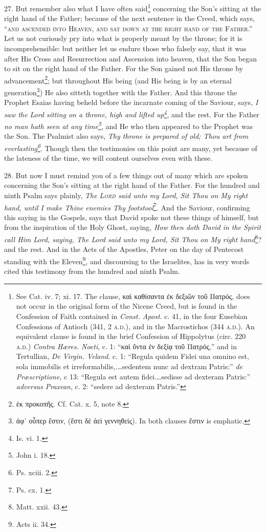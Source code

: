 27. But remember also what I have often said\footnote{See Cat. iv. 7; xi. 17. The clause, \textgreek{καὶ καθίσαντα ἐκ δεξιῶν τοῦ Πατρός}, does not occur in the original form of the Nicene Creed, but is found in the Confession of Faith contained in \emph{Const. Apost}. c. 41, in the four Eusebian Confessions of Antioch (341, 2 \textsc{a.d.}), and in the Macrostichos (344 \textsc{a.d.}). An equivalent clause is found in the brief Confession of Hippolytus (circ. 220 \textsc{a.d.}) \emph{Contra Hæres. Noeti}, c. 1: “\textgreek{καὶ ὄντα ἐν δεξίᾳ τοῦ Πατρός},” and in Tertullian, \emph{De Virgin. Veland}. c. 1: “Regula quidem Fidei una omnino est, sola immobilis et irreformabilis,.…sedentem nunc ad dextram Patris:” \emph{de Præscriptione}, c 13: “Regula est autem fidei.…sedisse ad dexteram Patris:” \emph{adversus Praxean}, c. 2: “sedere ad dexteram Patris.”} concerning the Son’s sitting at the right hand of the Father; because of the next sentence in the Creed, which says, “\textsc{and ascended into Heaven, and sat down at the right hand of the Father}.” Let us not curiously pry into what is properly meant by the throne; for it is incomprehensible: but neither let us endure those who falsely say, that it was after His Cross and Resurrection and Ascension into heaven, that the Son began to sit on the right hand of the Father. For the Son gained not His throne by advancement\footnote{\textgreek{ἐκ προκοπῆς}. Cf. Cat. x. 5, note 8.}; but throughout His being (and His being is by an eternal generation\footnote{\textgreek{ἀφ᾽ οὗπερ ἔστιν, (ἔστι δὲ ἀεὶ γεννηθείς}). In both clauses \textgreek{ἔστιν} is emphatic.}) He also sitteth together with the Father. And this throne the Prophet Esaias having beheld before the incarnate coming of the Saviour, says, \emph{I saw the Lord sitting on a throne, high and lifted up\footnote{Is. vi. 1.}}, and the rest. For the Father \emph{no man hath seen at any time\footnote{John i. 18.}}, and He who then appeared to the Prophet was the Son. The Psalmist also says, \emph{Thy throne is prepared of old; Thou art from everlasting\footnote{Ps. xciii. 2.}}. Though then the testimonies on this point are many, yet because of the lateness of the time, we will content ourselves even with these.

28. But now I must remind you of a few things out of many which are spoken concerning the Son’s sitting at the right hand of the Father. For the hundred and ninth Psalm says plainly, \emph{The \textsc{Lord} said unto my Lord, Sit Thou on My right hand, until I make Thine enemies Thy footstool}\footnote{Ps. cx. 1.}. And the Saviour, confirming this saying in the Gospels, says that David spoke not these things of himself, but from the inspiration of the Holy Ghost, saying, \emph{How then doth David in the Spirit call Him Lord, saying, The Lord said unto my Lord, Sit Thou on My right hand}\footnote{Matt. xxii. 43.}? and the rest. And in the Acts of the Apostles, Peter on the day of Pentecost standing with the Eleven\footnote{Acts ii. 34.}, and discoursing to the Israelites, has in very words cited this testimony from the hundred and ninth Psalm.

